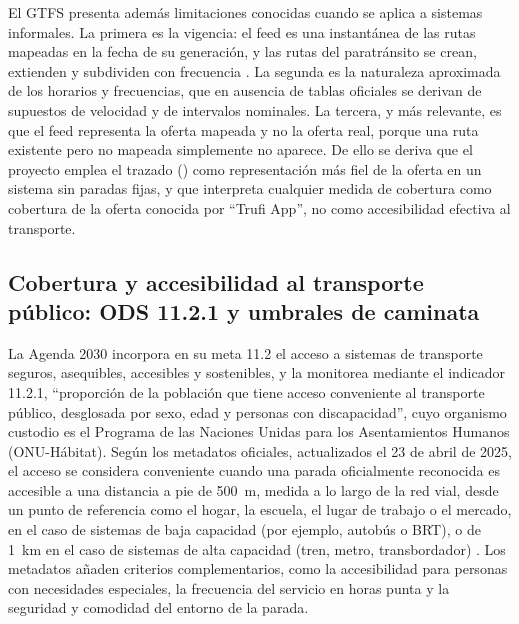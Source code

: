 El GTFS presenta además limitaciones conocidas cuando se aplica a sistemas informales. La
primera es la vigencia: el feed es una instantánea de las rutas mapeadas en la fecha de su
generación, y las rutas del paratránsito se crean, extienden y subdividen con frecuencia
\parencite{cabrera2022}. La segunda es la naturaleza aproximada de los horarios y
frecuencias, que en ausencia de tablas oficiales se derivan de supuestos de velocidad y de
intervalos nominales. La tercera, y más relevante, es que el feed representa la oferta
mapeada y no la oferta real, porque una ruta existente pero no mapeada simplemente no
aparece. De ello se deriva que el proyecto emplea el trazado () como
representación más fiel de la oferta en un sistema sin paradas fijas, y que interpreta
cualquier medida de cobertura como cobertura de la oferta conocida por ``Trufi App'', no como
accesibilidad efectiva al transporte.

\subsection{Cobertura y accesibilidad al transporte público: ODS 11.2.1 y umbrales de caminata}
\label{subsec:ods-11-2-1}

La Agenda 2030 incorpora en su meta 11.2 el acceso a sistemas de transporte seguros,
asequibles, accesibles y sostenibles, y la monitorea mediante el indicador 11.2.1,
\enquote{proporción de la población que tiene acceso conveniente al transporte público,
desglosada por sexo, edad y personas con discapacidad}, cuyo organismo custodio es el
Programa de las Naciones Unidas para los Asentamientos Humanos (ONU-Hábitat). Según los
metadatos oficiales, actualizados el 23 de abril de 2025, el acceso se considera conveniente
cuando una parada oficialmente reconocida es accesible a una distancia a pie de 500~m,
medida a lo largo de la red vial, desde un punto de referencia como el hogar, la escuela, el
lugar de trabajo o el mercado, en el caso de sistemas de baja capacidad (por ejemplo,
autobús o BRT), o de 1~km en el caso de sistemas de alta capacidad (tren, metro,
transbordador) \parencite{onu2025}. Los metadatos añaden criterios complementarios, como la
accesibilidad para personas con necesidades especiales, la frecuencia del servicio en horas
punta y la seguridad y comodidad del entorno de la parada.

